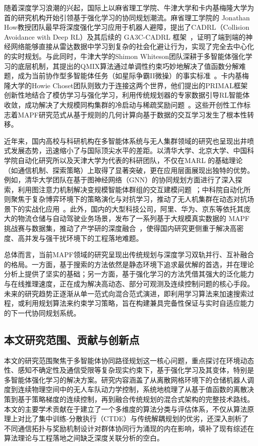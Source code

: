 \documentclass[13.5pt]{extarticle}
\begin{document}
随着深度学习浪潮的兴起，国际上以麻省理工学院、牛津大学和卡内基梅隆大学为首的研究机构开始引领基于强化学习的协同规划潮流。麻省理工学院的 Jonathan How教授团队最早将深度强化学习应用于机器人避障，提出了CADRL（Collision Avoidance with Deep RL）及其后续的 GA3C-CADRL 框架~\cite{chen2017socially}，证明了端到端的神经网络能够直接从雷达数据中学习到复杂的社会化避让行为，实现了完全去中心化的实时规划。与此同时，牛津大学的Shimon Whiteson团队深耕于多智能体强化学习的底层机制，其提出的QMIX算法通过单调性约束巧妙地解决了值函数分解难题，成为当前协作型多智能体任务（如星际争霸II微操）的事实标准~\cite{rashid2018qmix}。卡内基梅隆大学的Howie Choset团队则致力于连接这两个世界，他们提出的PRIMAL框架创新性地结合了模仿学习与强化学习，利用传统规划器的专家数据引导RL智能体收敛，成功解决了大规模同构集群的冷启动与稀疏奖励问题~\cite{sartoretti2019primal}。这些开创性工作标志着MAPF研究范式从基于规则的几何计算向基于数据的交互学习发生了根本性转移。

近年来，国内高校与科研机构在多智能体系统与无人集群领域的研究也呈现出井喷式发展态势，迅速缩小了与国际顶尖水平的差距。以清华大学、北京大学、中国科学院自动化研究所以及天津大学为代表的科研团队，不仅在MARL 的基础理论（如通信机制、探索策略）上取得了显著突破，更在应用层面展现出独特的优势。例如，清华大学团队在基于图神经网络（GNN）的协同规划方面进行了深入探索，利用图注意力机制解决变规模智能体群组的交互建模问题~\cite{wang2020learning, liu2020multi}；中科院自动化所则聚焦于复杂博弈环境下的策略演化与对抗学习，推动了无人机集群在动态对抗场景下的实战化应用~\cite{zhang2019hierarchical, hu2020voronoi}。此外，国内的大型科技公司，阿里、华为、京东等依托其庞大的物流仓储与自动驾驶业务场景，发布了一系列基于大规模真实数据的 MAPF 挑战赛与数据集，推动了产学研的深度融合~\cite{li2021lifelong, zhou2020smarts}，使得国内研究更侧重于解决高密度、高并发与强干扰环境下的工程落地难题。

总体而言，当前MAPF领域的研究呈现出传统规划与深度学习双轨并行、互补融合的格局。一方面，基于搜索的方法依然是静态环境下追求最优解的首选，并在理论分析上提供了坚实的基础；另一方面，基于强化学习的方法凭借其强大的泛化能力与在线推理速度，正在成为解决高动态、部分可观测及连续控制问题的核心手段。未来的研究趋势正逐渐从单一范式向混合范式演进，即利用学习算法来加速搜索过程，或利用规划算法来约束学习策略，旨在构建兼具完备性保证与实时自适应能力的下一代协同规划系统。

\subsection{本文研究范围、贡献与创新点}

本文的研究范围聚焦于多智能体协同路径规划这一核心问题，重点探讨在环境动态性、感知不确定性及通信受限等复杂现实约束下，基于强化学习及其变体，特别是多智能体强化学习的解决方案。研究内容涵盖了从离散网格环境下的仓储机器人调度到连续物理空间中的无人车队动力学控制，系统地梳理了从基于值函数的离散决策到基于策略梯度的连续控制，再到融合传统规划的混合式架构的完整技术路线。本文的主要学术贡献在于建立了一个多维度的算法分类与评估体系，不仅从算法原理上对比了集中训练-分散执行（CTDE）与传统解耦规划的优劣，还深入剖析了不同通信拓扑与奖励机制设计对群体协同行为涌现的内在影响，填补了现有综述在算法理论与工程落地之间缺乏深度关联分析的空白。
\end{document}
